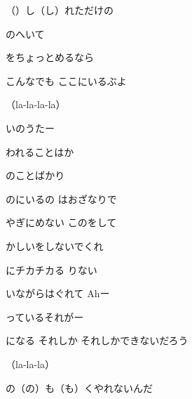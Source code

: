 \documentclass[a4paper,tate,twocolumn,12pt]{ltjtarticle}
\begin{document}
\begin{flushleft}
\begin{minipage}{\linewidth}
（）し（し）れただけの

のへいて

をちょっとめるなら

こんなでも ここにいるぶよ

（la-la-la-la）

いのうたー
\end{minipage}

\vspace{2em}

\noindent\begin{minipage}{\linewidth}
われることはか

のことばかり

のにいるの はおざなりで
\end{minipage}

\vspace{2em}

\noindent\begin{minipage}{\linewidth}
やぎにめない このをして

かしいをしないでくれ
\end{minipage}

\vspace{2em}

\noindent\begin{minipage}{\linewidth}
にチカチカる りない

いながらはぐれて Ahー

っているそれがー
\end{minipage}

\vspace{2em}

\noindent\begin{minipage}{\linewidth}
になる それしか それしかできないだろう

（la-la-la）

の（の）も（も）くやれないんだ


\end{minipage}
\end{flushleft}
\end{document}
